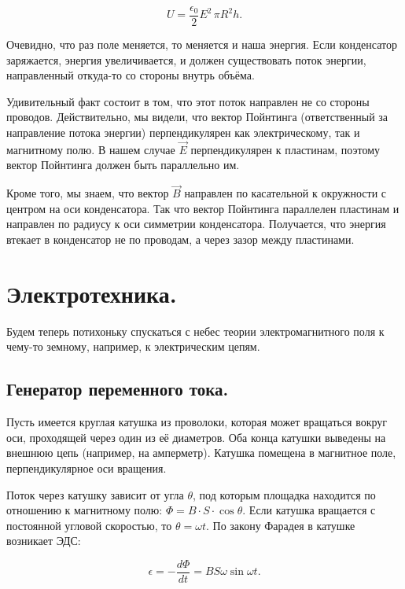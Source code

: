 \documentclass[11pt,a4paper]{article}
\numberwithin{equation}{section}
\newcommand{\eps}{\epsilon}
\begin{document}
\begin{equation}
  \label{eq:energy_cap}
  U = \frac{\eps_0}{2} E^2 \, \pi R^2 h.
\end{equation}

Очевидно, что раз поле меняется, то меняется и наша энергия. Если
конденсатор заряжается, энергия увеличивается, и должен существовать
поток энергии, направленный откуда-то со стороны внутрь объёма. 

Удивительный факт состоит в том, что этот поток направлен не со
стороны проводов. Действительно, мы видели, что вектор Пойнтинга
(ответственный за направление потока энергии) перпендикулярен как
электрическому, так и магнитному полю. В нашем случае $\vec{E}$
перпендикулярен к пластинам, поэтому вектор Пойнтинга должен быть
параллельно им. 

Кроме того, мы знаем, что вектор $\vec{B}$ направлен по касательной к
окружности с центром на оси конденсатора. Так что вектор Пойнтинга
параллелен пластинам и направлен по радиусу к оси симметрии
конденсатора. Получается, что энергия втекает в конденсатор не по
проводам, а через зазор между пластинами. 


\section{Электротехника.}
\label{sec:electrotechnics}

Будем теперь потихоньку спускаться с небес теории электромагнитного
поля к чему-то земному, например, к электрическим цепям.

\subsection{Генератор переменного тока. }
\label{sec:generator}

Пусть имеется круглая катушка из проволоки, которая может вращаться
вокруг оси, проходящей через один из её диаметров. Оба конца катушки
выведены на внешнюю цепь (например, на амперметр). Катушка помещена в
магнитное поле, перпендикулярное оси вращения. 

Поток через катушку зависит от угла $\theta$, под которым площадка находится по
отношению к магнитному полю: $\Phi = B\cdot S \cdot \cos \theta$. Если
катушка вращается с постоянной угловой скоростью, то $\theta = \omega
t$. По закону Фарадея в катушке возникает ЭДС:

\begin{equation}
  \label{eq:generator_faradey}
  \eps = -\frac{d \Phi}{dt}  = B S \omega \sin \omega t.
\end{equation}
\end{document}
